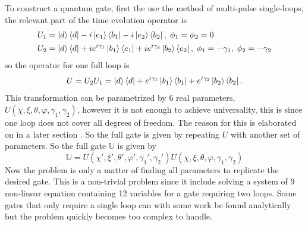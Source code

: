 To construct a quantum gate, first the use the method of multi-pulse single-loops\cite{sLoop}, the relevant part of the time evolution operator is 
\begin{equation}
\begin{aligned}&
U_1 = \ket{d}\bra{d} -i\ket{e_1}\bra{b_1} -i\ket{e_2}\bra{b_2},\; \phi_1 = \phi_2 = 0
\\&
U_2 = \ket{d}\bra{d} +ie^{i\gamma_1}\ket{b_1}\bra{e_1} +ie^{i\gamma_2}\ket{b_2}\bra{e_2},\; \phi_1 = -\gamma_1,\; \phi_2 = -\gamma_2
\end{aligned}
\end{equation}
so the operator for one full loop is 
\begin{equation}
U = U_2U_1 = \ket{d}\bra{d} + e^{i\gamma_1}\ket{b_1}\bra{b_1} + e^{i\gamma_2}\ket{b_2}\bra{b_2}.
\end{equation}
This transformation can be parametrized by $6$ real parameters, $U(\chi,\xi,\theta,\varphi,\gamma_1,\gamma_2)$, however it is not enough to achieve universality, this is since one loop does not cover all degrees of freedom. The reason for this is elaborated on in a later section . So the full gate is given by repeating $U$ with another set of parameters. So the full gate $\mathbb{U}$ is given by 
\begin{equation}
\mathbb{U} = U(\chi',\xi',\theta',\varphi',\gamma_1',\gamma_2') U(\chi,\xi,\theta,\varphi,\gamma_1,\gamma_2)
\end{equation}
Now the problem is only a matter of finding all parameters to replicate the desired gate. This is a non-trivial problem since it include solving a system of 9 non-linear equation containing 12 variables for a gate requiring two loops. Some gates that only require a single loop can with some work be found analytically but the problem quickly becomes too complex to handle.

